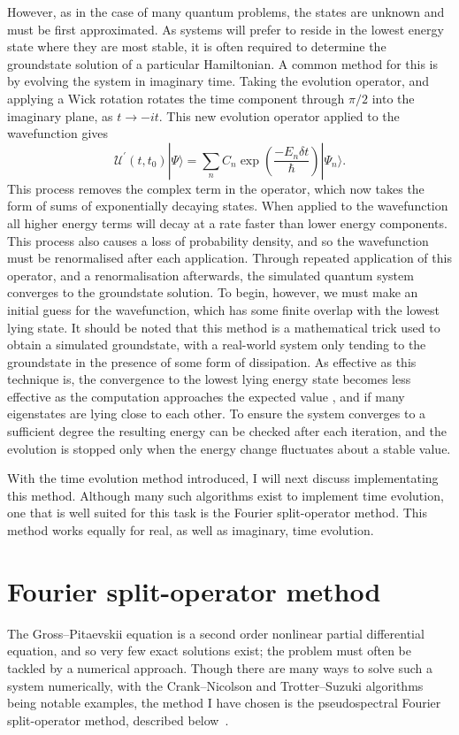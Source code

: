 However, as in the case of many quantum problems, the states are unknown and must be first approximated. As systems will prefer to reside in the lowest energy state where they are most stable, it is often required to determine the groundstate solution of a particular Hamiltonian. A common method for this is by evolving the system in imaginary time. Taking the evolution operator, and applying a Wick rotation \cite{NUM:Bader_jcp_2013} rotates the time component through $\pi/2$ into the imaginary plane, as $t \rightarrow -it$. This new evolution operator applied to the wavefunction gives
\begin{equation}
       \mathscr{U^{'}}(t,t_0)|\Psi \rangle = \displaystyle\sum\limits_{n} C_n \exp\left(\frac{-{E_n}\delta t}{\hbar}\right)|\Psi_n \rangle.
\end{equation}
This process removes the complex term in the operator, which now takes the form of sums of exponentially decaying states. When applied to the wavefunction all higher energy terms will decay at a rate faster than lower energy components. This process also causes a loss of probability density, and so the wavefunction must be renormalised after each application. Through repeated application of this operator, and a renormalisation afterwards, the simulated quantum system converges to the groundstate solution. To begin, however, we must make an initial guess for the wavefunction, which has some finite overlap with the lowest lying state. It should be noted that this method is a mathematical trick used to obtain a simulated groundstate, with a real-world system only tending to the groundstate in the presence of some form of dissipation. As effective as this technique is, the convergence to the lowest lying energy state becomes less effective as the computation approaches the expected value \cite{Vtx:Danaila_pra_2005}, and if many eigenstates are lying close to each other. To ensure the system converges to a sufficient degree the resulting energy can be checked after each iteration, and the evolution is stopped only when the energy change fluctuates about a stable value.

With the time evolution method introduced, I will next discuss implementating this method. Although many such algorithms exist to implement time evolution, one that is well suited for this task is the Fourier split-operator method. This method works equally for real, as well as imaginary, time evolution.

\section{Fourier split-operator method}\label{sec:fso}
The Gross--Pitaevskii equation is a second order nonlinear partial differential equation, and so very few exact solutions exist; the problem must often be tackled by a numerical approach. Though there are many ways to solve such a system numerically, with the Crank--Nicolson and Trotter--Suzuki algorithms being notable examples, the method I have chosen is the pseudospectral Fourier split-operator method, described below~\cite{Num:Bauke_cpc_2011}.

